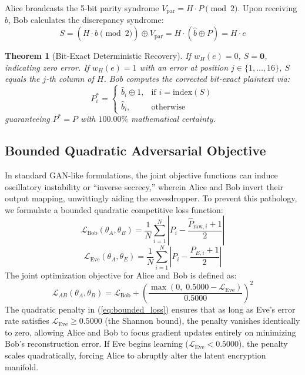 \documentclass[journal,10pt,twocolumn]{IEEEtran}
\newtheorem{theorem}{Theorem}
\begin{document}
Alice broadcasts the 5-bit parity syndrome $V_{\text{par}} = H \cdot P \pmod 2$. Upon receiving $\hat{b}$, Bob calculates the discrepancy syndrome:
\begin{equation}
    S = (H \cdot \hat{b} \pmod 2) \oplus V_{\text{par}} = H \cdot (\hat{b} \oplus P) = H \cdot e
\end{equation}
\begin{theorem}[Bit-Exact Deterministic Recovery]
If $w_H(e) = 0$, $S = \bm{0}$, indicating zero error. If $w_H(e) = 1$ with an error at position $j \in \{1, \dots, 16\}$, $S$ equals the $j$-th column of $H$. Bob computes the corrected bit-exact plaintext via:
\begin{equation}
    P^*_i = \begin{cases} \hat{b}_i \oplus 1, & \text{if } i = \text{index}(S) \\ \hat{b}_i, & \text{otherwise} \end{cases}
\end{equation}
guaranteeing $P^* = P$ with $100.00\%$ mathematical certainty.
\end{theorem}

\subsection{Bounded Quadratic Adversarial Objective}
In standard GAN-like formulations, the joint objective functions can induce oscillatory instability or ``inverse secrecy,'' wherein Alice and Bob invert their output mapping, unwittingly aiding the eavesdropper. To prevent this pathology, we formulate a bounded quadratic competitive loss function:
\begin{equation}
    \mathcal{L}_{\text{Bob}}(\theta_A, \theta_B) = \frac{1}{N} \sum_{i=1}^N \left| P_i - \frac{\hat{P}_{\text{raw}, i} + 1}{2} \right|
\end{equation}
\begin{equation}
    \mathcal{L}_{\text{Eve}}(\theta_A, \theta_E) = \frac{1}{N} \sum_{i=1}^N \left| P_i - \frac{P_{E, i} + 1}{2} \right|
\end{equation}
The joint optimization objective for Alice and Bob is defined as:
\begin{equation}
    \mathcal{L}_{AB}(\theta_A, \theta_B) = \mathcal{L}_{\text{Bob}} + \left( \frac{\max\left(0, \; 0.5000 - \mathcal{L}_{\text{Eve}}\right)}{0.5000} \right)^2
    \label{eq:bounded_loss}
\end{equation}
The quadratic penalty in (\ref{eq:bounded_loss}) ensures that as long as Eve's error rate satisfies $\mathcal{L}_{\text{Eve}} \ge 0.5000$ (the Shannon bound), the penalty vanishes identically to zero, allowing Alice and Bob to focus gradient updates entirely on minimizing Bob's reconstruction error. If Eve begins learning ($\mathcal{L}_{\text{Eve}} < 0.5000$), the penalty scales quadratically, forcing Alice to abruptly alter the latent encryption manifold.
\end{document}
